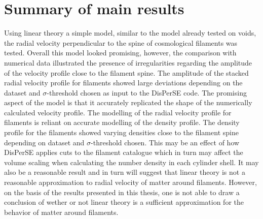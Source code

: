 \section{Summary of main results}\label{sec:mainresults}
Using linear theory a simple model, similar to the model already tested on voids, the radial velocity perpendicular to the spine of cosmological filaments was tested. Overall this model looked promising, however, the comparison with numerical data illustrated the presence of irregularities regarding the amplitude of the velocity profile close to the filament spine. The amplitude of the stacked radial velocity profile for filaments showed large deviations depending on the dataset and $\sigma$-threshold chosen as input to the DisPerSE code. The promising aspect of the model is that it accurately replicated the shape of the numerically calculated velocity profile. The modelling of the radial velocity profile for filaments is reliant on accurate modelling of the density profile. The density profile for the filaments showed varying densities close to the filament spine depending on dataset and $\sigma$-threshold chosen. This may be an effect of how DisPerSE applies cuts to the filament catalogue which in turn may affect the volume scaling when calculating the number density in each cylinder shell. It may also be a reasonable result and in turn will suggest that linear theory is not a reasonable approximation to radial velocity of matter around filaments. However, on the basis of the results presented in this thesis, one is not able to draw a conclusion of wether or not linear theory is a sufficient approximation for the behavior of matter around filaments.\\\indent
